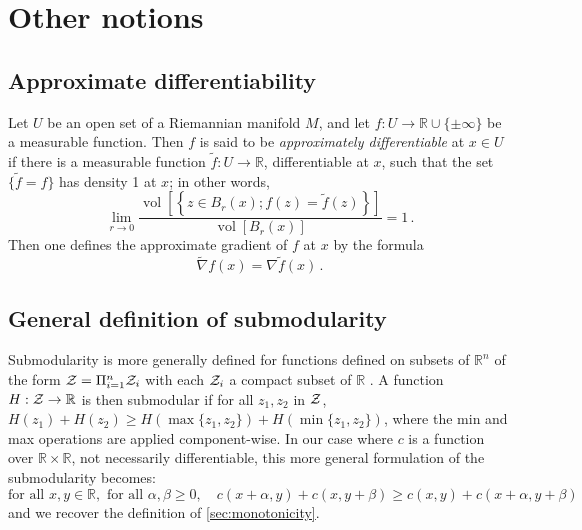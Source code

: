 \section{Other notions}
    \subsection{Approximate differentiability}
    \begin{defi}
        Let $U$ be an open set of a Riemannian manifold $M$, and let $f: U \to \mathbb{R} \cup\{\pm \infty\}$ be a measurable function. Then $f$ is said to be \emph{approximately differentiable} at $x \in U$ if there is a measurable function $\tilde{f}: U \to \mathbb{R}$, differentiable at $x$, such that the set $\{\tilde{f}=f\}$ has density 1 at $x$; in other words,
        $$\lim _{r \to 0} \frac{\operatorname{vol}\left[\left\{z \in B_r(x) ; f(z)=\tilde{f}(z)\right\}\right]}{\operatorname{vol}\left[B_r(x)\right]}=1\, .$$
        Then one defines the approximate gradient of $f$ at $x$ by the formula
        $$\tilde{\nabla} f(x)=\nabla \tilde{f}(x)\,.$$
        \label{def:approx-grad}
    \end{defi}

    \subsection{General definition of submodularity}
    \label{sec:submod-general}
    \begin{defi}
        Submodularity is more generally defined for functions defined on subsets of $\mathbb{R}^n$ of the form $\mathcal{Z}=\Pi_{i=1}^n\mathcal{Z}_{i}$ with each $\mathcal{Z}_{i}$ a compact subset of $\mathbb{R}$ \cite{bach2019submodular}. A function $H:\mathcal{Z}\to \mathbb{R}$ is then submodular if for all $z_{1},z_{2}$ in $\mathcal{Z}$, $H(z_{1})+H(z_{2})\geq H(\max\{ z_{1},z_{2}\}  )+H(\min\{ z_{1},z_{2}\}  )$, where the min and max operations are applied component-wise.
        In our case where $c$ is a function over $\mathbb{R}\times\mathbb{R}$, not necessarily differentiable, this more general formulation of the submodularity becomes:
        \begin{equation*}
            \text{for all } x,y\in\mathbb{R},\text{ for all }\alpha,\beta\geq0,\quad c(x+\alpha,y)+c(x,y+\beta) \geq c(x,y)+c(x+\alpha,y+\beta)
        \end{equation*}
        and we recover the definition of \cref{sec:monotonicity}.
    \end{defi}


